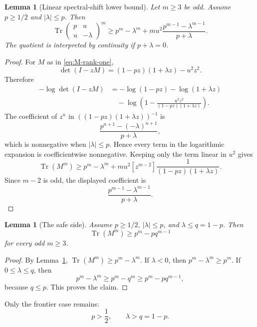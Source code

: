 \documentclass[11pt]{article}
\newtheorem{lemma}[theorem]{Lemma}
\newcommand{\Tr}{\operatorname{Tr}}
\begin{document}
\begin{lemma}[Linear spectral-shift lower bound]\label{lem:linear-shift}
Let $m\ge3$ be odd.  Assume $p\ge1/2$ and $|\lambda|\le p$.  Then
\begin{equation}\label{eq:linear-shift}
        \Tr\begin{pmatrix}p&u\\ u&-\lambda\end{pmatrix}^m
        \ge
        p^m-\lambda^m
        +m u^2\frac{p^{m-1}-\lambda^{m-1}}{p+\lambda}.
\end{equation}
The quotient is interpreted by continuity if $p+\lambda=0$.
\end{lemma}

\begin{proof}
For $M$ as in \eqref{eq:M-rank-one},
\[
        \det(I-zM)=(1-pz)(1+\lambda z)-u^2z^2.
\]
Therefore
\[
\begin{aligned}
        -\log\det(I-zM)
        &=-\log(1-pz)-\log(1+\lambda z) \\
        &\quad
        -\log\left(1-
        \frac{u^2z^2}{(1-pz)(1+\lambda z)}
        \right).
\end{aligned}
\]
The coefficient of $z^n$ in $((1-pz)(1+\lambda z))^{-1}$ is
\[
        \frac{p^{n+1}-(-\lambda)^{n+1}}{p+\lambda},
\]
which is nonnegative when $|\lambda|\le p$.  Hence every term in the logarithmic expansion is coefficientwise nonnegative.  Keeping only the term linear in $u^2$ gives
\[
        \Tr(M^m)
        \ge p^m-\lambda^m
        +m u^2[z^{m-2}]\frac{1}{(1-pz)(1+\lambda z)}.
\]
Since $m-2$ is odd, the displayed coefficient is
\[
        \frac{p^{m-1}-\lambda^{m-1}}{p+\lambda}.
\]
\end{proof}

\begin{lemma}[The safe side]\label{lem:rank-one-safe-side}
Assume $p\ge1/2$, $|\lambda|\le p$, and $\lambda\le q=1-p$.  Then
\[
        \Tr(M^m)\ge p^m-pq^{m-1}
\]
for every odd $m\ge3$.
\end{lemma}

\begin{proof}
By Lemma~\ref{lem:linear-shift}, $\Tr(M^m)\ge p^m-\lambda^m$.  If $\lambda<0$, then $p^m-\lambda^m\ge p^m$.  If $0\le\lambda\le q$, then
\[
        p^m-\lambda^m\ge p^m-q^m\ge p^m-pq^{m-1},
\]
because $q\le p$.  This proves the claim.
\end{proof}

Only the frontier case remains:
\begin{equation}\label{eq:frontier-case}
        p>\frac12,
        \qquad
        \lambda>q=1-p.
\end{equation}
\end{document}
